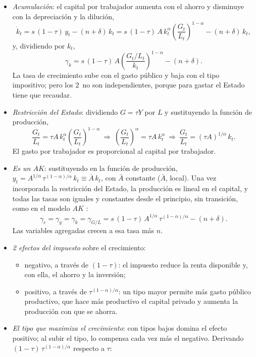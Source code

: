 \documentclass[11pt]{article}
\begin{document}
\begin{itemize}
\item \emph{Acumulación}: el capital por trabajador aumenta con el ahorro y disminuye con la depreciación y la dilución,
  \[\dot k_t=s\,(1-\tau)\,y_t-(n+\delta)\,k_t=s\,(1-\tau)\,A\,k_t^{\alpha}\left(\frac{G_t}{L_t}\right)^{1-\alpha}-(n+\delta)\,k_t,\]
  y, dividiendo por $k_t$,
  \[\gamma_k=s\,(1-\tau)\,A\left(\frac{G_t/L_t}{k_t}\right)^{1-\alpha}-(n+\delta).\]
  La tasa de crecimiento sube con el gasto público y baja con el tipo impositivo; pero los 2~no son independientes, porque para gastar el Estado tiene que recaudar.
\item \emph{Restricción del Estado}: dividiendo $G=\tau Y$ por $L$ y sustituyendo la función de producción,
  \[\frac{G_t}{L_t}=\tau A\,k_t^{\alpha}\left(\frac{G_t}{L_t}\right)^{1-\alpha}\ \Longrightarrow\ \left(\frac{G_t}{L_t}\right)^{\alpha}=\tau A\,k_t^{\alpha}\ \Longrightarrow\ \frac{G_t}{L_t}=(\tau A)^{1/\alpha}\,k_t.\]
  El gasto por trabajador es proporcional al capital por trabajador.
\item \emph{Es un $AK$}: sustituyendo en la función de producción, $y_t=A^{1/\alpha}\,\tau^{(1-\alpha)/\alpha}\,k_t\equiv\bar A\,k_t$, con $\bar A$ constante ($\bar A$, local). Una vez incorporada la restricción del Estado, la producción es lineal en el capital, y todas las tasas son iguales y constantes desde el principio, sin transición, como en el modelo $AK$ :
  \begin{equation}\label{eq:barro}
  \gamma_c=\gamma_y=\gamma_k=\gamma_{G/L}=s\,(1-\tau)\,A^{1/\alpha}\,\tau^{(1-\alpha)/\alpha}-(n+\delta).
  \end{equation}
  Las variables agregadas crecen a esa tasa más $n$.
\item \emph{2 efectos del impuesto} sobre el crecimiento:
  \begin{itemize}
  \item \textcolor{tceerojo}{negativo}, a través de \textcolor{tceerojo}{$(1-\tau)$}: el impuesto reduce la renta disponible y, con ella, el ahorro y la inversión;
  \item \textcolor{tceeverde}{positivo}, a través de \textcolor{tceeverde}{$\tau^{(1-\alpha)/\alpha}$}: un tipo mayor permite más gasto público productivo, que hace más productivo el capital privado y aumenta la producción con que se ahorra.
  \end{itemize}
\item \emph{El tipo que maximiza el crecimiento}: con tipos bajos domina el efecto positivo; al subir el tipo, lo compensa cada vez más el negativo. Derivando $(1-\tau)\,\tau^{(1-\alpha)/\alpha}$ respecto a $\tau$:

\end{itemize}
\end{document}
